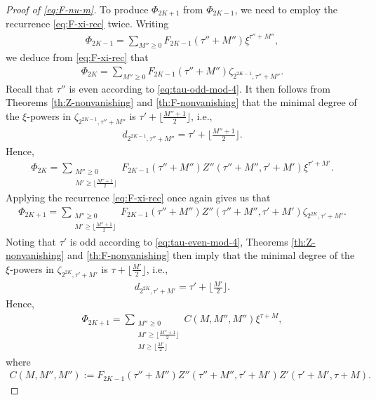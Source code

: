 \documentclass[12pt,reqno]{amsart}
\numberwithin{equation}{section}
\theoremstyle{theorem}
\theoremstyle{definition}
\begin{document}
\begin{proof}[Proof of \eqref{eq:F-nu-m}]
	To produce $\Phi_{2K+1}$ from $\Phi_{2K-1}$, we need to employ the recurrence \eqref{eq:F-xi-rec} twice. Writing
	\begin{align*}
		\Phi_{2K-1} = \sum_{M''\ge 0} F_{2K-1}(\tau'' + M'')\xi^{\tau''+M''},
	\end{align*}
	we deduce from \eqref{eq:F-xi-rec} that
	\begin{align*}
		\Phi_{2K} = \sum_{M''\ge 0} F_{2K-1}(\tau'' + M'')\zeta_{2^{2K-1},\tau'' + M''}.
	\end{align*}
	Recall that $\tau''$ is even according to \eqref{eq:tau-odd-mod-4}. It then follows from Theorems \ref{th:Z-nonvanishing} and \ref{th:F-nonvanishing} that the minimal degree of the $\xi$-powers in $\zeta_{2^{2K-1},\tau'' + M''}$ is $\tau'+\lfloor\tfrac{M''+1}{2}\rfloor$, i.e.,
	\begin{align}\label{eq:d-tau-2}
		d_{2^{2K-1},\tau'' + M''} = \tau'+\lfloor\tfrac{M''+1}{2}\rfloor.
	\end{align}
	Hence,
	\begin{align*}
		\Phi_{2K} = \sum_{\substack{M''\ge 0\\M'\ge \lfloor\frac{M''+1}{2}\rfloor}} F_{2K-1}(\tau'' + M'')Z''(\tau'' + M'',\tau'+M')\xi^{\tau'+M'}.
	\end{align*}
	Applying the recurrence \eqref{eq:F-xi-rec} once again gives us that
	\begin{align*}
		\Phi_{2K+1} = \sum_{\substack{M''\ge 0\\M'\ge \lfloor\frac{M''+1}{2}\rfloor}} F_{2K-1}(\tau'' + M'')Z''(\tau'' + M'',\tau'+M')\zeta_{2^{2K},\tau' + M'}.
	\end{align*}
	Noting that $\tau'$ is odd according to \eqref{eq:tau-even-mod-4}, Theorems \ref{th:Z-nonvanishing} and \ref{th:F-nonvanishing} then imply that the minimal degree of the $\xi$-powers in $\zeta_{2^{2K},\tau' + M'}$ is $\tau+\lfloor\tfrac{M'}{2}\rfloor$, i.e.,
	\begin{align}\label{eq:d-tau-1}
		d_{2^{2K},\tau' + M'} = \tau'+\lfloor\tfrac{M'}{2}\rfloor.
	\end{align}
	Hence,
	\begin{align*}
		\Phi_{2K+1} = \sum_{\substack{M''\ge 0\\M'\ge \lfloor\frac{M''+1}{2}\rfloor\\M\ge \lfloor\frac{M'}{2}\rfloor}} C(M,M'',M'') \xi^{\tau+M},
	\end{align*}
	where
	\begin{align*}
		C(M,M'',M''):=F_{2K-1}(\tau'' + M'')Z''(\tau'' + M'',\tau'+M')Z'(\tau' + M',\tau+M).
	\end{align*}
	

\end{proof}
\end{document}
